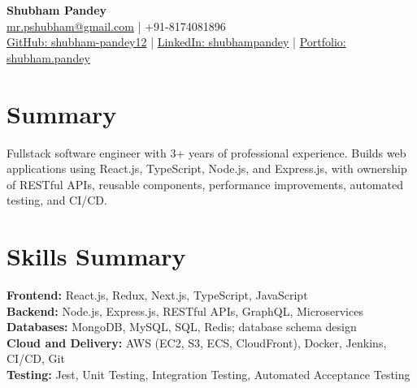 \documentclass[a4paper,10pt]{article}
\begin{document}
\begin{center}
{\LARGE\textbf{Shubham Pandey}}\\[3pt]
\href{mailto:mr.pshubham@gmail.com}{mr.pshubham@gmail.com} | +91-8174081896\\[2pt]
\href{https://github.com/shubham-pandey12}{GitHub: shubham-pandey12} | \href{https://www.linkedin.com/in/shubham-pandey-a74716199/}{LinkedIn: shubhampandey} | \href{https://shubham-portfolio-mocha.vercel.app/}{Portfolio: shubham.pandey}
\end{center}
\section{Summary}
Fullstack software engineer with 3+ years of professional experience. Builds web applications using React.js, TypeScript, Node.js, and Express.js, with ownership of RESTful APIs, reusable components, performance improvements, automated testing, and CI/CD.

\section{Skills Summary}
\textbf{Frontend:} React.js, Redux, Next.js, TypeScript, JavaScript\\
\textbf{Backend:} Node.js, Express.js, RESTful APIs, GraphQL, Microservices\\
\textbf{Databases:} MongoDB, MySQL, SQL, Redis; database schema design\\
\textbf{Cloud and Delivery:} AWS (EC2, S3, ECS, CloudFront), Docker, Jenkins, CI/CD, Git\\
\textbf{Testing:} Jest, Unit Testing, Integration Testing, Automated Acceptance Testing
\end{document}
